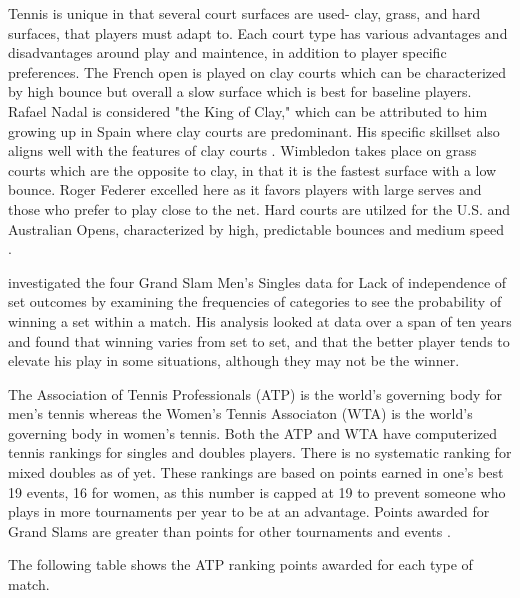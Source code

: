 \documentclass[12pt]{article}
\begin{document}
Tennis is unique in that several court surfaces are used- clay, grass, and hard 
surfaces, that players must adapt to. Each court type has various advantages and
disadvantages around play and maintence, in addition to player specific preferences.
The French open is played on clay courts which can be characterized by high bounce
but overall a slow surface which is best for baseline players. Rafael Nadal is 
considered "the King of Clay," which can be attributed to him growing up in Spain
where clay courts are predominant. His specific skillset also aligns well with the
features of clay courts \citet{Jurejko2018French}. Wimbledon takes place on grass 
courts which are the opposite to clay, in that it is the fastest surface with a low bounce. 
Roger Federer excelled here as it favors players with large serves and those who prefer to play close to the
net. Hard courts are utilzed for the U.S. and Australian Opens, characterized by high,
predictable bounces and medium speed \citet{Schwartz1977The}. 

\citet{Pollard2006} investigated the four Grand Slam Men's Singles data for Lack of 
independence of set outcomes by examining the frequencies of categories to see the 
probability of winning a set within a match. His analysis looked at data over a span of 
ten years and found that winning varies from set to set, and that the better player tends 
to elevate his play in some situations, although they may not be the winner.

The Association of Tennis Professionals (ATP) is the world's governing
body for men's tennis whereas the Women's Tennis Associaton (WTA)
is the world's governing body in women's tennis. Both the ATP and
WTA have computerized tennis rankings for singles and doubles players.
There is no systematic ranking for mixed doubles as of yet. These
rankings are based on points earned in one's best 19 events, 16 for women,
as this number is capped at 19 to prevent someone who plays in more tournaments
per year to be at an advantage. Points awarded for Grand Slams are greater
than points for other tournaments and events \citet{Nag2022Tennis}.

The following table shows the ATP ranking points awarded for each type of match.
\end{document}
